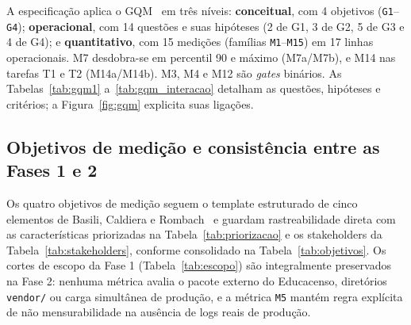 \documentclass[conference]{model/IEEEtran}%
\begin{document}
\makeatletter
\setlength{\@dblfptop}{0pt}
\setlength{\@dblfpsep}{12pt}
\setlength{\@dblfpbot}{0pt plus 1fil}
\makeatother


A especificação aplica o GQM~\cite{basili1994gqm} em três níveis: \textbf{conceitual}, com 4 objetivos (\texttt{G1}--\texttt{G4}); \textbf{operacional}, com 14 questões e suas hipóteses (2 de G1, 3 de G2, 5 de G3 e 4 de G4); e \textbf{quantitativo}, com 15 medições (famílias \texttt{M1}--\texttt{M15}) em 17 linhas operacionais. M7 desdobra-se em percentil 90 e máximo (M7a/M7b), e M14 nas tarefas T1 e T2 (M14a/M14b). M3, M4 e M12 são \textit{gates} binários. As Tabelas~\ref{tab:gqm1} a~\ref{tab:gqm_interacao} detalham as questões, hipóteses e critérios; a Figura~\ref{fig:gqm} explicita suas ligações.

\subsection{Objetivos de medição e consistência entre as Fases 1 e 2}
Os quatro objetivos de medição seguem o template estruturado de cinco elementos de Basili, Caldiera e Rombach~\cite{basili1994gqm} e guardam rastreabilidade direta com as características priorizadas na Tabela~\ref{tab:priorizacao} e os stakeholders da Tabela~\ref{tab:stakeholders}, conforme consolidado na Tabela~\ref{tab:objetivos}. Os cortes de escopo da Fase 1 (Tabela~\ref{tab:escopo}) são integralmente preservados na Fase 2: nenhuma métrica avalia o pacote externo do Educacenso, diretórios \texttt{vendor/} ou carga simultânea de produção, e a métrica \texttt{M5} mantém regra explícita de não mensurabilidade na ausência de logs reais de produção.
\end{document}
